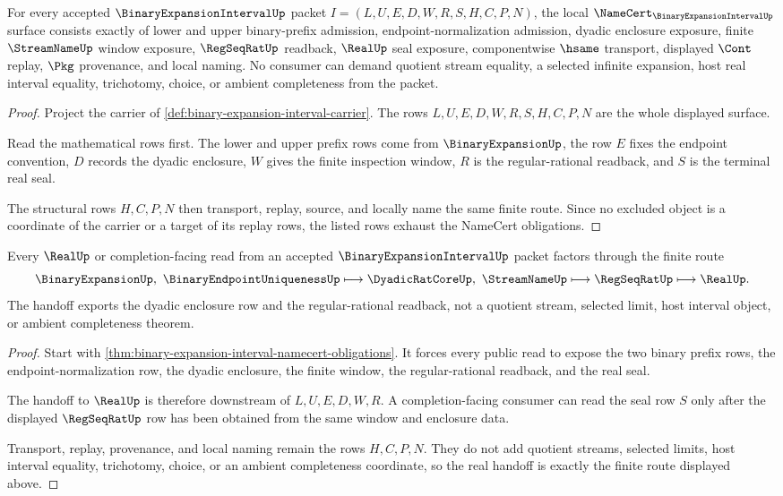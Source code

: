 \begin{theorem}
\label{thm:binary-expansion-interval-namecert-obligations}
For every accepted $\BinaryExpansionIntervalUp$ packet $I=(L,U,E,D,W,R,S,H,C,P,N)$, the local $\NameCert_{\BinaryExpansionIntervalUp}$ surface consists exactly of lower and upper binary-prefix admission, endpoint-normalization admission, dyadic enclosure exposure, finite $\StreamNameUp$ window exposure, $\RegSeqRatUp$ readback, $\RealUp$ seal exposure, componentwise $\hsame$ transport, displayed $\Cont$ replay, $\Pkg$ provenance, and local naming. No consumer can demand quotient stream equality, a selected infinite expansion, host real interval equality, trichotomy, choice, or ambient completeness from the packet.
\end{theorem}
\begin{proof}
Project the carrier of \autoref{def:binary-expansion-interval-carrier}. The rows $L,U,E,D,W,R,S,H,C,P,N$ are the whole displayed surface.

Read the mathematical rows first. The lower and upper prefix rows come from $\BinaryExpansionUp$, the row $E$ fixes the endpoint convention, $D$ records the dyadic enclosure, $W$ gives the finite inspection window, $R$ is the regular-rational readback, and $S$ is the terminal real seal.

The structural rows $H,C,P,N$ then transport, replay, source, and locally name the same finite route. Since no excluded object is a coordinate of the carrier or a target of its replay rows, the listed rows exhaust the NameCert obligations.
\end{proof}

\begin{theorem}
\label{thm:binary-expansion-interval-real-handoff}
Every $\RealUp$ or completion-facing read from an accepted $\BinaryExpansionIntervalUp$ packet factors through the finite route
$$
\BinaryExpansionUp,\ \BinaryEndpointUniquenessUp
\longmapsto
\DyadicRatCoreUp,\ \StreamNameUp
\longmapsto
\RegSeqRatUp
\longmapsto
\RealUp .
$$
The handoff exports the dyadic enclosure row and the regular-rational readback, not a quotient stream, selected limit, host interval object, or ambient completeness theorem.
\end{theorem}
\begin{proof}
Start with \autoref{thm:binary-expansion-interval-namecert-obligations}. It forces every public read to expose the two binary prefix rows, the endpoint-normalization row, the dyadic enclosure, the finite window, the regular-rational readback, and the real seal.

The handoff to $\RealUp$ is therefore downstream of $L,U,E,D,W,R$. A completion-facing consumer can read the seal row $S$ only after the displayed $\RegSeqRatUp$ row has been obtained from the same window and enclosure data.

Transport, replay, provenance, and local naming remain the rows $H,C,P,N$. They do not add quotient streams, selected limits, host interval equality, trichotomy, choice, or an ambient completeness coordinate, so the real handoff is exactly the finite route displayed above.
\end{proof}

